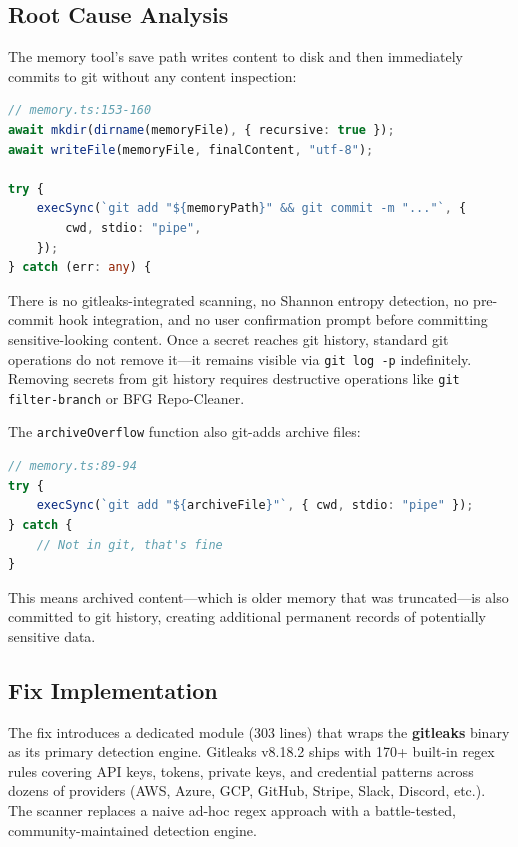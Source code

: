 \subsection*{Root Cause Analysis}
The memory tool's save path writes content to disk and then immediately commits to git without any content inspection:

\begin{lstlisting}[language=TypeScript]
// memory.ts:153-160
await mkdir(dirname(memoryFile), { recursive: true });
await writeFile(memoryFile, finalContent, "utf-8");

try {
    execSync(`git add "${memoryPath}" && git commit -m "..."`, {
        cwd, stdio: "pipe",
    });
} catch (err: any) {
\end{lstlisting}

There is no gitleaks-integrated scanning, no Shannon entropy detection, no pre-commit hook integration, and no user confirmation prompt before committing sensitive-looking content. Once a secret reaches git history, standard git operations do not remove it---it remains visible via \texttt{git log -p} indefinitely. Removing secrets from git history requires destructive operations like \texttt{git filter-branch} or BFG Repo-Cleaner.

The \texttt{archiveOverflow} function also git-adds archive files:

\begin{lstlisting}[language=TypeScript]
// memory.ts:89-94
try {
    execSync(`git add "${archiveFile}"`, { cwd, stdio: "pipe" });
} catch {
    // Not in git, that's fine
}
\end{lstlisting}

This means archived content---which is older memory that was truncated---is also committed to git history, creating additional permanent records of potentially sensitive data.

\subsection*{Fix Implementation}
The fix introduces a dedicated  module (303 lines) that wraps the \textbf{gitleaks} binary as its primary detection engine. Gitleaks v8.18.2 ships with 170+ built-in regex rules covering API keys, tokens, private keys, and credential patterns across dozens of providers (AWS, Azure, GCP, GitHub, Stripe, Slack, Discord, etc.). The scanner replaces a naive ad-hoc regex approach with a battle-tested, community-maintained detection engine.


